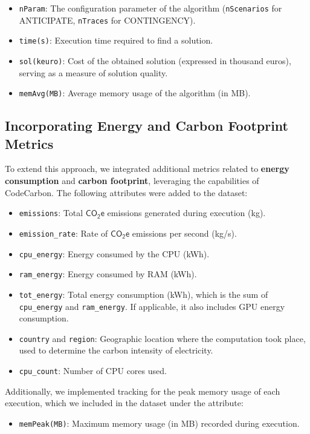 \documentclass[a4paper,singleside,12pt]{report} %
\begin{document}
\begin{itemize}
    \item \verb|nParam|: The configuration parameter of the algorithm (\verb|nScenarios| for ANTICIPATE, \verb|nTraces| for 
    CONTINGENCY).
    \item \verb|time(s)|: Execution time required to find a solution.
    \item \verb|sol(keuro)|: Cost of the obtained solution (expressed in thousand euros), serving as a measure of solution quality.
    \item \verb|memAvg(MB)|: Average memory usage of the algorithm (in MB).
\end{itemize}

\subsection{Incorporating Energy and Carbon Footprint Metrics}

To extend this approach, we integrated additional metrics related to \textbf{energy consumption} and \textbf{carbon footprint}, 
leveraging the capabilities of CodeCarbon. The following attributes were added to the dataset:

\begin{itemize}
    \item \verb|emissions|: Total $\mathsf{CO_2e}$ emissions generated during execution (kg).
    \item \verb|emission_rate|: Rate of $\mathsf{CO_2e}$ emissions per second (kg/s).
    \item \verb|cpu_energy|: Energy consumed by the CPU (kWh).
    \item \verb|ram_energy|: Energy consumed by RAM (kWh).
    \item \verb|tot_energy|: Total energy consumption (kWh), which is the sum of \verb|cpu_energy| and \verb|ram_energy|. If 
    applicable, it also includes GPU energy consumption.
    \item \verb|country| and \verb|region|: Geographic location where the computation took place, used to determine the carbon 
    intensity of electricity.
    \item \verb|cpu_count|: Number of CPU cores used.
\end{itemize}

Additionally, we implemented tracking for the peak memory usage of each execution, which we included in the dataset under the 
attribute:

\begin{itemize}
    \item \verb|memPeak(MB)|: Maximum memory usage (in MB) recorded during execution.
\end{itemize}
\end{document}
